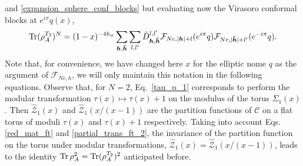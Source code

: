 \documentclass[a4paper,11pt]{article}
\def\Tr{\mathop{\mbox{\normalfont Tr}}\nolimits}
\begin{document}
and \eqref{expansion_sphere_conf_blocks} but evaluating now
the Virasoro conformal blocks at $e^{i\pi}q(x)$,
\begin{equation}\label{partial_trans_cb}
 \Tr(\rho_A^{T_2})^N=(1-x)^{-4h_\sigma}\sum_{\boldsymbol{h}, \boldsymbol{\bar{h}}}\sum_{l, l'} 
 \tilde{D}_{\boldsymbol{h}, \boldsymbol{\bar{h}}}^{l, l'} 
 \mathcal{F}_{Nc, |\boldsymbol{h}|+l}(e^{i\pi}q)\mathcal{F}_{Nc, |\boldsymbol{\bar{h}}|+l'}(e^{-i\pi}q).
\end{equation}
Note that, for convenience, we have changed here $x$ for the elliptic nome $q$ 
as the argument of $\mathcal{F}_{Nc, h}$, we will only maintain this notation in 
the following equations. Observe that, for $N=2$, Eq.~\eqref{tau_p_1} corresponds to perform the modular 
transformation $\tau(x)\mapsto \tau(x)+1$ on the modulus of the torus $\Sigma_1(x)$.
Then $\hat{\mathcal{Z}}_1(x)$ and $\hat{\mathcal{Z}}_1(x/(x-1))$ are the partition functions
of $\mathcal{C}$ on a flat torus of moduli $\tau(x)$ and $\tau(x)+1$ respectively. Taking into account Eqs.
\eqref{red_mat_ft} and \eqref{partial_trans_ft_2}, the invariance of the partition function on the torus under modular transformations, 
$\hat{\mathcal{Z}}_1(x)=\hat{\mathcal{Z}}_1(x/(x-1))$, leads to the identity $\Tr\rho_A^2=\Tr(\rho_A^{T_2})^2$ anticipated before.
\end{document}
